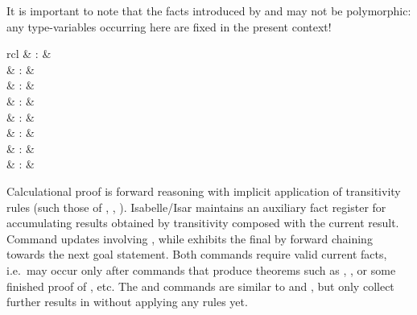 \begin{isabellebody}
\begin{isamarkuptext}
  It is important to note that the facts introduced by \mbox{} and \mbox{} may not be polymorphic: any
  type-variables occurring here are fixed in the present context!%
\end{isamarkuptext}%
\isamarkuptrue%
%
\isamarkuptrue%
%
\begin{isamarkuptext}%
\begin{matharray}{rcl}
    \mbox{} & : &  \\
    \mbox{} & : &  \\
    \mbox{} & : &  \\
    \mbox{} & : &  \\
    \mbox{}\isa{\isactrlsup {\isacharasterisk}} & : &  \\
    \mbox{} & : & \isaratt \\
    \mbox{} & : & \isaratt \\
    \mbox{} & : & \isaratt \\
  \end{matharray}

  Calculational proof is forward reasoning with implicit application
  of transitivity rules (such those of \isa{{\isacharequal}}, \isa{{\isasymle}},
  \isa{{\isacharless}}).  Isabelle/Isar maintains an auxiliary fact register
  \mbox{} for accumulating results obtained by
  transitivity composed with the current result.  Command \mbox{} updates \mbox{} involving \mbox{}, while
  \mbox{} exhibits the final \mbox{} by
  forward chaining towards the next goal statement.  Both commands
  require valid current facts, i.e.\ may occur only after commands
  that produce theorems such as \mbox{}, \mbox{}, or some finished proof of \mbox{}, \mbox{} etc.  The \mbox{} and \mbox{}
  commands are similar to \mbox{} and \mbox{},
  but only collect further results in \mbox{} without
  applying any rules yet.


\end{isamarkuptext}
\end{isabellebody}
